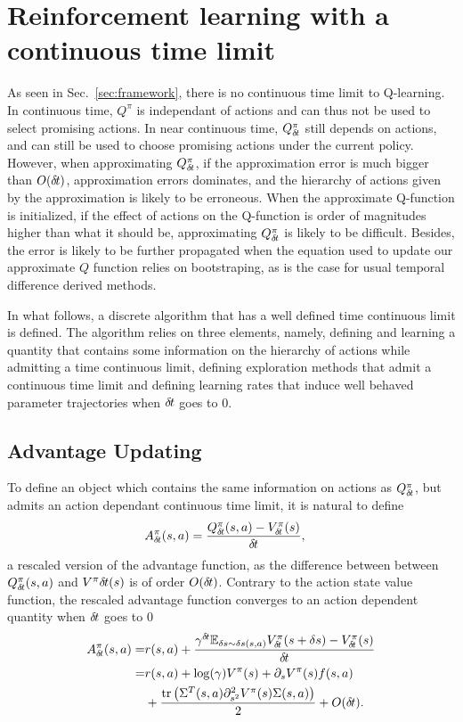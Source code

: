 \section{Reinforcement learning with a continuous time limit}
As seen in Sec.~\ref{sec:framework}, there is no continuous time limit to
Q-learning. In continuous time, $Q^\pi$ is independant of actions and can thus
not be used to select promising actions.  In near continuous time, $Q^\pi_{\delta\hspace{-.1em}t}$
still depends on actions, and can still be used to choose promising actions
under the current policy. However, when approximating $Q^\pi_{\delta\hspace{-.1em}t}$, if the
approximation error is much bigger than $O({\delta\hspace{-.1em}t})$, approximation errors
dominates, and the hierarchy of actions given by the approximation is likely to
be erroneous.  When the approximate Q-function is initialized, if the effect of
actions on the Q-function is order of magnitudes higher than what it should be,
approximating $Q^\pi_{\delta\hspace{-.1em}t}$ is likely to be difficult. Besides, the error is likely
to be further propagated when the equation used to update our approximate $Q$
function relies on bootstraping, as is the case for usual temporal difference
derived methods.

In what follows, a discrete algorithm that has a well defined time continuous
limit is defined. The algorithm relies on three elements, namely, defining and
learning a quantity that contains some information on the hierarchy of actions
while admitting a time continuous limit, defining exploration methods that
admit a continuous time limit and defining learning rates that induce well
behaved parameter trajectories when ${\delta\hspace{-.1em}t}$ goes to $0$.

\subsection{Advantage Updating}
\label{subsec:reparam}
To define an object which contains the same information on actions as
$Q^\pi_{\delta\hspace{-.1em}t}$, but admits an action dependant continuous time limit, it is
natural to define
\begin{align}
	A^\pi_{\delta\hspace{-.1em}t}(s, a) &= \frac{Q^\pi_{\delta\hspace{-.1em}t}(s,a) - V^\pi_{\delta\hspace{-.1em}t}(s)}{{\delta\hspace{-.1em}t}},
    \label{eq:adv}
\end{align}
a rescaled version of the advantage function, as the difference between between
$Q^\pi_{\delta\hspace{-.1em}t}(s, a)$ and $V^\pi{\delta\hspace{-.1em}t}(s)$ is of order $O({\delta\hspace{-.1em}t})$.
Contrary to the action state value function, the rescaled advantage function converges
to an action dependent quantity when ${\delta\hspace{-.1em}t}$ goes to $0$ 
\begin{align}
	A^\pi_{\delta\hspace{-.1em}t}(s, a)=&{r}(s, a)+\frac{\gamma^{{\delta\hspace{-.1em}t}}\mathbb{E}_{\delta s \sim \delta s(s, a)}V^\pi_{\delta\hspace{-.1em}t}(s + \delta s)-V^\pi_{\delta\hspace{-.1em}t}(s)}{{\delta\hspace{-.1em}t}}\nonumber\\
	=&{r}(s, a)+\log(\gamma) V^\pi(s)+\partial_s V^\pi(s)f(s, a)\nonumber\\
         &+\frac{\text{tr}\left(\Sigma^T(s, a)\partial^2_{s^2}V^\pi(s) \Sigma(s,a)\right)}{2} + O({\delta\hspace{-.1em}t})\nonumber.
\end{align}

